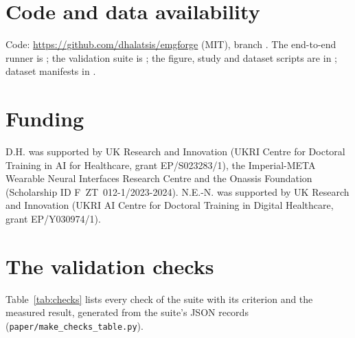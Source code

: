 \documentclass[11pt,a4paper]{article}
\newcommand{\repo}{\url{https://github.com/dhalatsis/emgforge}}
\begin{document}
\section*{Code and data availability}
Code: \repo{} (MIT), branch . The end-to-end runner is
; the validation suite is
; the figure, study and dataset scripts are in
; dataset manifests in .

\section*{Funding}
D.H. was supported by UK Research and Innovation (UKRI Centre for Doctoral Training in AI
for Healthcare, grant EP/S023283/1), the Imperial-META Wearable Neural Interfaces Research
Centre and the Onassis Foundation (Scholarship ID F~ZT~012-1/2023-2024). N.E.-N. was
supported by UK Research and Innovation (UKRI AI Centre for Doctoral Training in Digital
Healthcare, grant EP/Y030974/1).

\FloatBarrier



\appendix
\section{The validation checks}
\label{app:checks}
Table~\ref{tab:checks} lists every check of the suite with its criterion and the measured
result, generated from the suite's JSON records (\texttt{paper/make\_checks\_table.py}).
\small
{}
\normalsize
\end{document}
